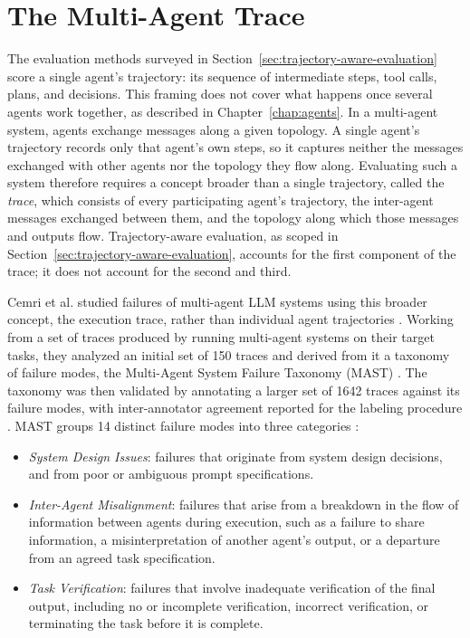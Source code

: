 \section{The Multi-Agent Trace}
\label{sec:multi-agent-trace}

The evaluation methods surveyed in Section~\ref{sec:trajectory-aware-evaluation} score a single agent's trajectory: its sequence of intermediate steps, tool calls, plans, and decisions. This framing does not cover what happens once several agents work together, as described in Chapter~\ref{chap:agents}. In a multi-agent system, agents exchange messages along a given topology. A single agent's trajectory records only that agent's own steps, so it captures neither the messages exchanged with other agents nor the topology they flow along. Evaluating such a system therefore requires a concept broader than a single trajectory, called the \emph{trace}, which consists of every participating agent's trajectory, the inter-agent messages exchanged between them, and the topology along which those messages and outputs flow. Trajectory-aware evaluation, as scoped in Section~\ref{sec:trajectory-aware-evaluation}, accounts for the first component of the trace; it does not account for the second and third.

Cemri et al. studied failures of multi-agent LLM systems using this broader concept, the execution trace, rather than individual agent trajectories \cite{cemriWhyMultiAgentLLM2025a}. Working from a set of traces produced by running multi-agent systems on their target tasks, they analyzed an initial set of 150 traces and derived from it a taxonomy of failure modes, the Multi-Agent System Failure Taxonomy (MAST) \cite{cemriWhyMultiAgentLLM2025a}. The taxonomy was then validated by annotating a larger set of 1642 traces against its failure modes, with inter-annotator agreement reported for the labeling procedure \cite{cemriWhyMultiAgentLLM2025a}. MAST groups 14 distinct failure modes into three categories \cite{cemriWhyMultiAgentLLM2025a}:

\begin{itemize}
    \item \emph{System Design Issues}: failures that originate from system design decisions, and from poor or ambiguous prompt specifications.
    \item \emph{Inter-Agent Misalignment}: failures that arise from a breakdown in the flow of information between agents during execution, such as a failure to share information, a misinterpretation of another agent's output, or a departure from an agreed task specification.
    \item \emph{Task Verification}: failures that involve inadequate verification of the final output, including no or incomplete verification, incorrect verification, or terminating the task before it is complete.
\end{itemize}

